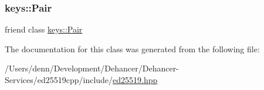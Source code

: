 \subsubsection{\texorpdfstring{keys::Pair}{keys::Pair}}
{\footnotesize\ttfamily friend class \mbox{\hyperlink{classed25519_1_1keys_1_1_pair}{keys\+::\+Pair}}\hspace{0.3cm}{\ttfamily [friend]}}



The documentation for this class was generated from the following file\+:\begin{DoxyCompactItemize}
\item 
/\+Users/denn/\+Development/\+Dehancer/\+Dehancer-\/\+Services/ed25519cpp/include/\mbox{\hyperlink{ed25519_8hpp}{ed25519.\+hpp}}\end{DoxyCompactItemize}
